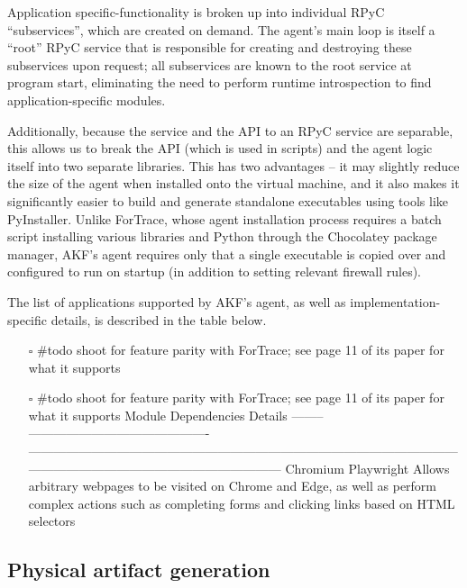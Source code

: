 Application specific-functionality is broken up into individual RPyC
``subservices'', which are created on demand. The agent's main loop is
itself a ``root'' RPyC service that is responsible for creating and
destroying these subservices upon request; all subservices are known to
the root service at program start, eliminating the need to perform
runtime introspection to find application-specific modules.

Additionally, because the service and the API to an RPyC service are
separable, this allows us to break the API (which is used in scripts)
and the agent logic itself into two separate libraries. This has two
advantages -- it may slightly reduce the size of the agent when
installed onto the virtual machine, and it also makes it significantly
easier to build and generate standalone executables using tools like
PyInstaller. Unlike ForTrace, whose agent installation process requires
a batch script installing various libraries and Python through the
Chocolatey package manager, AKF's agent requires only that a single
executable is copied over and configured to run on startup (in addition
to setting relevant firewall rules).

The list of applications supported by AKF's agent, as well as
implementation-specific details, is described in the table below.

\begin{itemize}
\item[$\square$]
  \#todo shoot for feature parity with ForTrace; see page 11 of its
  paper for what it supports
\item[$\square$]
  \#todo shoot for feature parity with ForTrace; see page 11 of its
  paper for what it supports Module \textbar{} Dependencies \textbar{}
  Details \textbar{} \textbar{} -------- \textbar{}
  ------------------------------------------- \textbar{}
  ------------------------------------------------------------------------------------------------------------------------------------------------------------------
  \textbar{} \textbar{} Chromium \textbar{} Playwright
  \cite{MicrosoftPlaywrightpython2025} \textbar{} Allows arbitrary
  webpages to be visited on Chrome and Edge, as well as perform complex
  actions such as completing forms and clicking links based on HTML
  selectors \textbar{}
\end{itemize}

\subsection{Physical artifact
generation}\label{physical-artifact-generation}

